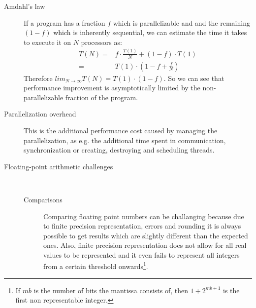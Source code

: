 \documentclass{article}
\begin{document}
\begin{description}
	\item[Amdahl's law] 

	If a program has a fraction $f$ which is parallelizable and and the remaining $(1-f)$ which is inherently sequential, we can estimate the time it takes to execute it on $N$ processors as:
	\begin{align}
		T(N) =& f \cdot \frac{T(1)}{N} + (1 - f) \cdot T(1)\\
		=& T(1) \cdot (1 - f + \frac{f}{N})
	\end{align}
	Therefore $lim_{N\to\infty} T(N) = T(1) \cdot (1 - f)$. So we can see that performance improvement is asymptotically limited by the non-parallelizable fraction of the program.

	\item[Parallelization overhead] This is the additional performance cost caused by managing the parallelization, as e.g. the additional time spent in communication, synchronization or creating, destroying and scheduling threads.
	
	\item[Floating-point arithmetic challenges] ~
		\begin{description}
			\item[Comparisons] Comparing floating point numbers can be challanging because due to finite precision representation, errors and rounding it is always possible to get results which are slightly different than the expected ones.
			Also, finite precision representation does not allow for all real values to be represented and it even fails to represent all integers from a certain threshold onwards\footnote{If $mb$ is the number of bits the mantissa consists of, then $1+2^{mb + 1}$ is the first non representable integer.}.


\end{description}
\end{description}
\end{document}
